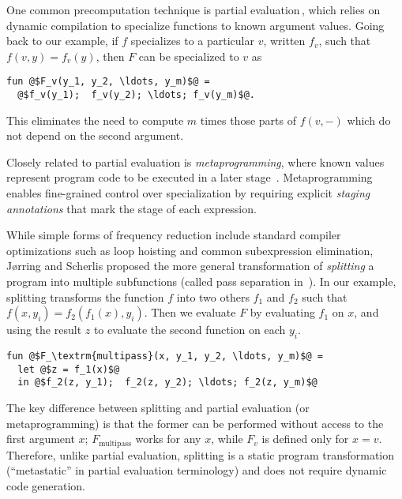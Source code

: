 One common precomputation technique is partial
evaluation\,\cite{futamura71,jones96}, which relies on dynamic
compilation to specialize functions to known argument values. Going
back to our example, if $f$ specializes to a particular $v$, written
$f_v$, such that $f(v,y) = f_v(y)$, then $F$ can be specialized to $v$
as
\begin{lstlisting}
fun @$F_v(y_1, y_2, \ldots, y_m)$@ = 
  @$f_v(y_1);  f_v(y_2); \ldots; f_v(y_m)$@.
\end{lstlisting}
This eliminates the need to compute $m$ times those parts of $f(v,-)$
which do not depend on the second argument.

Closely related to partial evaluation is {\em metaprogramming}, where
known values represent program code to be executed in a later stage
\,\cite{davies96,Taha97,DP01-modal,NP05-nn}. Metaprogramming enables
fine-grained control over specialization by requiring explicit
\emph{staging annotations} that mark the stage of each expression.




While simple forms of frequency reduction include standard compiler
optimizations such as loop hoisting and common subexpression
elimination, J{\o}rring and Scherlis proposed the more general
transformation of {\em splitting} a program into multiple subfunctions
(called pass separation in \,\cite{JS86-staging}). In our example,
splitting transforms the function $f$ into two others $f_1$ and $f_2$
such that $f(x,y_i) = f_2(f_1(x),y_i)$. Then we evaluate $F$ by
evaluating $f_1$ on $x$, and using the result $z$ to evaluate
the second function on each $y_i$.
%
\begin{lstlisting}
fun @$F_\textrm{multipass}(x, y_1, y_2, \ldots, y_m)$@ = 
  let @$z = f_1(x)$@
  in @$f_2(z, y_1);  f_2(z, y_2); \ldots; f_2(z, y_m)$@
\end{lstlisting}
%
The key difference between splitting and partial evaluation (or
metaprogramming) is that the former can be performed without access to
the first argument $x$; $F_\textrm{multipass}$ works for any $x$,
while $F_v$ is defined only for $x=v$.  Therefore, unlike partial
evaluation, splitting is a static program transformation
(``metastatic'' in partial evaluation terminology) and does not require
dynamic code generation.

